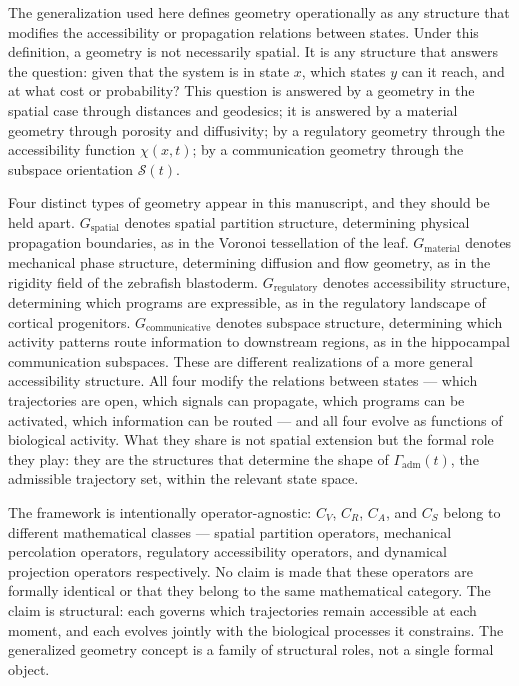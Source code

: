 \documentclass[12pt, a4paper, openany]{book}
\theoremstyle{definition}
\theoremstyle{remark}
\begin{document}
The generalization used here defines geometry operationally as any structure that modifies the accessibility or propagation relations between states. Under this definition, a geometry is not necessarily spatial. It is any structure that answers the question: given that the system is in state $x$, which states $y$ can it reach, and at what cost or probability? This question is answered by a geometry in the spatial case through distances and geodesics; it is answered by a material geometry through porosity and diffusivity; by a regulatory geometry through the accessibility function $\chi(x,t)$; by a communication geometry through the subspace orientation $\mathcal{S}(t)$.

Four distinct types of geometry appear in this manuscript, and they should be held apart. $G_{\text{spatial}}$ denotes spatial partition structure, determining physical propagation boundaries, as in the Voronoi tessellation of the leaf. $G_{\text{material}}$ denotes mechanical phase structure, determining diffusion and flow geometry, as in the rigidity field of the zebrafish blastoderm. $G_{\text{regulatory}}$ denotes accessibility structure, determining which programs are expressible, as in the regulatory landscape of cortical progenitors. $G_{\text{communicative}}$ denotes subspace structure, determining which activity patterns route information to downstream regions, as in the hippocampal communication subspaces.
These are different realizations of a more general accessibility structure. All four modify the relations between states — which trajectories are open, which signals can propagate, which programs can be activated, which information can be routed — and all four evolve as functions of biological activity. What they share is not spatial extension but the formal role they play: they are the structures that determine the shape of $\Gamma_{\mathrm{adm}}(t)$, the admissible trajectory set, within the relevant state space.

The framework is intentionally operator-agnostic: $C_V$, $C_R$, $C_A$, and $C_S$ belong to different mathematical classes — spatial partition operators, mechanical percolation operators, regulatory accessibility operators, and dynamical projection operators respectively. No claim is made that these operators are formally identical or that they belong to the same mathematical category. The claim is structural: each governs which trajectories remain accessible at each moment, and each evolves jointly with the biological processes it constrains. The generalized geometry concept is a family of structural roles, not a single formal object.
\end{document}
